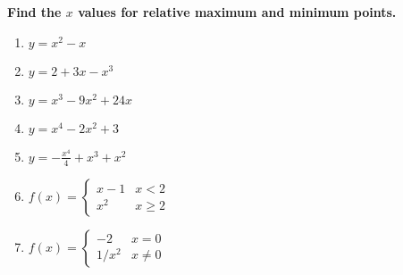 \begin{exercise}
    ~\\\\\-\hspace{0.3cm} \textbf{
        Find the $x$ values for relative maximum and minimum points.
    }\cite{mooc}
    \twocol
    \begin{enumerate} 
        \item $y=x^2-x$ 
        \item $y=2+3x-x^3$ 
        \item $y=x^3-9x^2+24x$
        \item $y=x^4-2x^2+3$ 
        \item $y=-\frac{x^4}{4}+x^3+x^2$ 
        \item $f(x) = \begin{cases} x-1 & x < 2  \\
        x^2 & x\geq 2 \end{cases}$
        \item $f(x) =\begin{cases} -2 & x = 0  \\
        1/x^2 & x \neq 0 \end{cases}$
    \end{enumerate}
    \endtwocol
\end{exercise}
